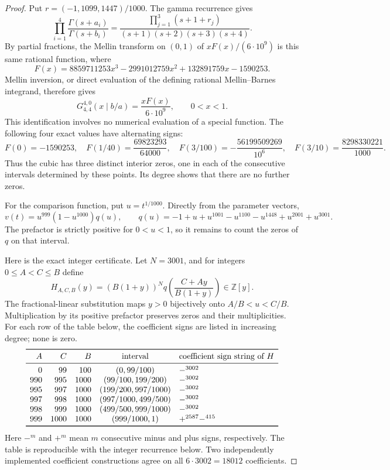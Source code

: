 \documentclass[10pt]{article}
\begin{document}
\begin{proof}
Put \(r=(-1,1099,1447)/1000\). The gamma recurrence gives
\[
 \prod_{i=1}^4\frac{\Gamma(s+a_i)}{\Gamma(s+b_i)}
 =\frac{\prod_{j=1}^3(s+1+r_j)}{(s+1)(s+2)(s+3)(s+4)}.
\]
By partial fractions, the Mellin transform on \((0,1)\) of
\(xF(x)/(6\cdot10^9)\) is this same rational function, where
\[
 F(x)=8859711253x^3-2991012759x^2+132891759x-1590253.
\]
Mellin inversion, or direct evaluation of the defining rational
Mellin--Barnes integrand, therefore gives
\[
 G^{4,0}_{4,4}(x\mid b/a)=\frac{xF(x)}{6\cdot10^9},
 \qquad 0<x<1.
\]
This identification involves no numerical evaluation of a special
function. The following four exact values have alternating signs:
\[
 F(0)=-1590253,\quad
 F(1/40)=\frac{69823293}{64000},\quad
 F(3/100)=-\frac{56199509269}{10^6},\quad
 F(3/10)=\frac{8298330221}{1000}.
\]
Thus the cubic has three distinct interior zeros, one in each
of the consecutive intervals determined by these points.
Its degree shows that there are no further zeros.

For the comparison function, put \(u=t^{1/1000}\). Directly
from the parameter vectors,
\begin{equation}\label{comparison}
 v(t)=u^{999}(1-u^{1000})q(u),\qquad
 q(u)=-1+u+u^{1001}-u^{1100}-u^{1448}+u^{2001}+u^{3001}.
\end{equation}
The prefactor is strictly positive for \(0<u<1\), so it remains
to count the zeros of \(q\) on that interval.

Here is the exact integer certificate. Let \(N=3001\), and for
integers \(0\le A<C\le B\) define
\[
 H_{A,C,B}(y)=(B(1+y))^N
    q\left(\frac{C+Ay}{B(1+y)}\right)\in\mathbb Z[y].
\]
The fractional-linear substitution maps \(y>0\) bijectively onto
\(A/B<u<C/B\). Multiplication by its positive prefactor preserves
zeros and their multiplicities. For each row of the table below,
the coefficient signs are listed in increasing degree; none is zero.
\[
\begin{array}{rrrcl}
\toprule
A&C&B&\text{interval}&\text{coefficient sign string of }H\\
\midrule
0&99&100&(0,99/100)&-^{3002}\\
990&995&1000&(99/100,199/200)&-^{3002}\\
995&997&1000&(199/200,997/1000)&-^{3002}\\
997&998&1000&(997/1000,499/500)&-^{3002}\\
998&999&1000&(499/500,999/1000)&-^{3002}\\
999&1000&1000&(999/1000,1)&+^{2587}-^{415}\\
\bottomrule
\end{array}
\]
Here \(-^m\) and \(+^m\) mean \(m\) consecutive minus and plus
signs, respectively. The table is reproducible with the integer
recurrence below. Two independently implemented coefficient
constructions agree on all \(6\cdot3002=18012\) coefficients.


\end{proof}
\end{document}
